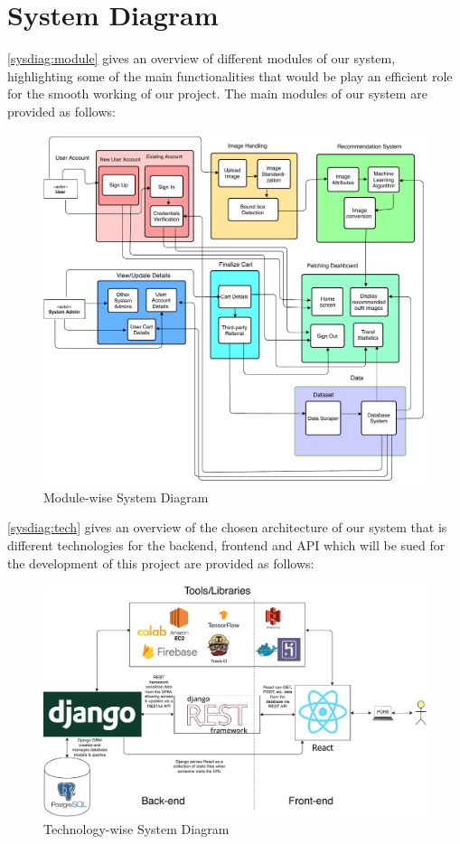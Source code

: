 \section{System Diagram}
\label{srs:sysdiag}
\autoref{sysdiag:module} gives an overview of different modules of our system, highlighting some of the main functionalities that would be play an efficient role for the smooth working of our project. The main modules of our system are provided as follows:
\begin{figure}[H]
\includegraphics[width=15cm]{images/systemDiagramModule.pdf} 
\centering
\caption{Module-wise System Diagram}
\label{sysdiag:module}
\end{figure}
\autoref{sysdiag:tech} gives an overview of the chosen architecture of our system that is different technologies for the backend, frontend and API which will be sued for the development of this project are provided as follows:
\begin{figure}[H]
\includegraphics[width=15cm]{images/systemDiagramTech.pdf} 
\centering
\caption{Technology-wise System Diagram}
\label{sysdiag:tech}
\end{figure}

